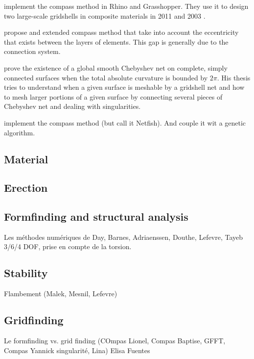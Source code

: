  implement the compass method in Rhino and Grasshopper. They use it to design two large-scale gridshells in composite materials in 2011 \cite{Baverel2012} and 2003 \Cite{DuPeloux2016}.

 propose and extended compass method that take into account the eccentricity that exists between the layers of elements. This gap is generally due to the connection system.

 prove the existence of a global smooth Chebyshev net on complete, simply connected surfaces when the total absolute curvature is bounded by $2\pi$. His thesis tries to understand when a given surface is meshable by a gridshell net and how to mesh larger portions of a given surface by connecting several pieces of Chebyshev net and dealing with singularities.

\cite{Pone2016} implement the compass method (but call it Netfish). And couple it wit a genetic algorithm.




\subsection{Material}
\subsection{Erection}


\cite{Labonnote2016,Fernandes2016}


\subsection{Formfinding and structural analysis}
Les méthodes numériques de Day, Barnes, Adriaenssen, Douthe, Lefevre, Tayeb
3/6/4 DOF, prise en compte de la torsion.
\citet{Adriaenssens1999, Adriaenssens2001}
\cite{Barnes2013}
\cite{DAmico2014}
\cite{DAmico2016}
\cite{Poulsen2015}
\cite{Vaulot2016}

\cite{DuPeloux2015}
\citet{Malek2012}

\subsection{Stability}
Flambement (Malek, Mesnil, Lefevre)
\citet{Mesnil2013}
\citet{Mesnil2015a}
\citet{Mesnil2017a}
\citet{Lefevre2015}
\citet{Tayeb2013}
\cite{Toussaint2007}

\subsection{Gridfinding}
Le formfinding vs. grid finding (COmpas Lionel, Compas Baptise, GFFT, Compas Yannick singularité, Lina)
Elisa Fuentes

